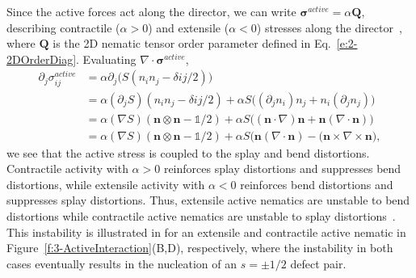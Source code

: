 Since the active forces act along the director, we can write $\bm{\sigma}^{active} = \alpha \mathbf{Q}$, describing contractile ($\alpha > 0$) and extensile ($\alpha < 0$) stresses along the director~\cite{RN11}, where $\mathbf{Q}$ is the 2D nematic tensor order parameter defined in Eq.~\ref{e:2-2DOrderDiag}.
Evaluating $\nabla \cdot \bm{\sigma}^{active}$,
\begin{align}
  \partial_j \sigma^{active}_{ij} &= \alpha \partial_j \big(S(n_in_j - \delta{ij}/2)\big)\label{e:3-ActiveInstabilityA} \\
  &= \alpha(\partial_j S)(n_in_j - \delta{ij}/2) + \alpha S \big((\partial_j n_i)n_j + n_i(\partial_j n_j) \big) \\
  &= \alpha (\nabla S)(\mathbf{n} \otimes \mathbf{n}-\mathbb{1}/2) + \alpha S \big((\mathbf{n} \cdot \nabla)\mathbf{n} + \mathbf{n}(\nabla \cdot \mathbf{n}) \big) \\
  &=  \alpha (\nabla S)(\mathbf{n} \otimes \mathbf{n}-\mathbb{1}/2) + \alpha S \big(\mathbf{n}(\nabla \cdot \mathbf{n}) - (\mathbf{n} \times \nabla \times \mathbf{n}  \big),\label{e:3-ActiveInstabilityD}
\end{align}
we see that the active stress is coupled to the splay and bend distortions.
Contractile activity with $\alpha > 0$ reinforces splay distortions and suppresses bend distortions, while extensile activity with $\alpha < 0$ reinforces bend distortions and suppresses splay distortions.
Thus, extensile active nematics are unstable to bend distortions while contractile active nematics are unstable to splay distortions~\cite{RN171,RN170,RN11}.
This instability is illustrated in for an extensile and contractile active nematic in Figure~\ref{f:3-ActiveInteraction}(B,D), respectively, where the instability in both cases eventually results in the nucleation of an $s=\pm 1/2$ defect pair.

